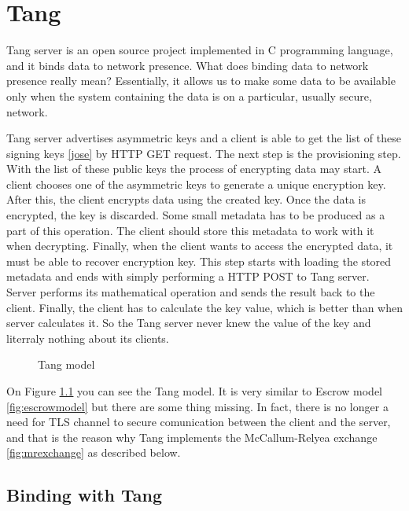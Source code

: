 \documentclass[../xdudla00-porting-Tang-to-Open-WRT.tex]{subfiles}
\begin{document}
\chapter{Tang}\label{tang}
Tang server is an open source project implemented in C \cite{c} programming language, and it binds data to network presence.
What does binding data to network presence really mean?
Essentially, it allows us to make some data to be available only when the system containing the data is on a particular, usually secure, network.

Tang server advertises asymmetric keys\cite{askey} and a client is able to get the list of these signing keys \ref{jose} by HTTP \cite{http} GET request.
The next step is the provisioning step. With the list of these public keys the process of encrypting data may start.
A client chooses one of the asymmetric keys to generate a unique encryption key.
After this, the client encrypts data using the created key. Once the data is encrypted, the key is discarded.
Some small metadata has to be produced as a part of this operation. The client should store this metadata to work with it when decrypting.
Finally, when the client wants to access the encrypted data, it must be able to recover encryption key.
This step starts with loading the stored metadata and ends with simply performing a HTTP\cite{http} POST to Tang server.
Server performs its mathematical operation and sends the result back to the client.
Finally, the client has to calculate the key value, which is better than when server calculates it.
So the Tang server never knew the value of the key and literraly nothing about its clients.

\begin{figure}[h]
    \centering
    \caption{Tang model}
    \label{fig:tangmodel}
\end{figure}

On Figure \ref{fig:tangmodel} you can see the Tang model.
It is very similar to Escrow model \ref{fig:escrowmodel} but there are some thing missing.
In fact, there is no longer a need for TLS channel to secure comunication between the client and the server,
 and that is the reason why Tang implements the McCallum-Relyea exchange \ref{fig:mrexchange} as described below.

\section{Binding with Tang}
\end{document}
